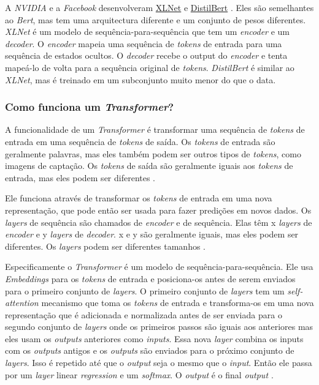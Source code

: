 A \textit{NVIDIA} e a \textit{Facebook} desenvolveram \href{https://arxiv.org/abs/1906.08237}{XLNet} e \href{https://arxiv.org/abs/1810.04805}{DistilBert} \cite{yt2}. Eles são semelhantes ao \textit{Bert}, mas tem uma arquitectura diferente e um conjunto de pesos diferentes. \textit{XLNet} é um modelo de sequência-para-sequência que tem um \textit{encoder} e um \textit{decoder}. O \textit{encoder} mapeia uma sequência de \textit{tokens} de entrada para uma sequência de estados ocultos. O \textit{decoder} recebe o output do \textit{encoder} e tenta mapeá-lo de volta para a sequência original de \textit{tokens}. \textit{DistilBert} é similar ao \textit{XLNet}, mas é treinado em um subconjunto muito menor do que o data.

\subsubsection{Como funciona um \textit{Transformer}?}

A funcionalidade de um \textit{Transformer} é transformar uma sequência de \textit{tokens} de entrada em uma sequência de \textit{tokens} de saída. Os \textit{tokens} \cite{mft1} \cite{mft2} de entrada são geralmente palavras, mas eles também podem ser outros tipos de \textit{tokens}, como imagens de captação. Os \textit{tokens} de saída são geralmente iguais aos \textit{tokens} de entrada, mas eles podem ser diferentes \cite{hf1}.

Ele funciona através de transformar os \textit{tokens} de entrada em uma nova representação, que pode então ser usada para fazer predições em novos dados. Os \textit{layers} de sequência são chamados de \textit{encoder} \cite{mft1} e de sequência. Elas têm x \textit{layers} de \textit{encoder} e y \textit{layers} de \textit{decoder}. x e y são geralmente iguais, mas eles podem ser diferentes. Os \textit{layers} podem ser diferentes tamanhos \cite{hf1}.

Especificamente o \textit{Transformer} é um modelo de sequência-para-sequência. Ele usa \textit{Embeddings} para os \textit{tokens} de entrada e posiciona-os antes de serem enviados para o primeiro conjunto de \textit{layers}. O primeiro conjunto de \textit{layers} tem um \textit{self-attention} \cite{mtf2} mecanismo que toma os \textit{tokens} \cite{mft1} de entrada e transforma-os em uma nova representação que é adicionada e normalizada antes de ser enviada para o segundo conjunto de \textit{layers} onde os primeiros passos são iguais aos anteriores mas eles usam os \textit{outputs} anteriores como \textit{inputs}. Essa nova \textit{layer} combina os inputs com os \textit{outputs} antigos e os \textit{outputs} são enviados para o próximo conjunto de \textit{layers}. Isso é repetido até que o \textit{output} seja o mesmo que o \textit{input}. Então ele passa por um \textit{layer} linear \textit{regression} e um \textit{softmax}. O \textit{output} é o final \textit{output \cite{hf1}}.

